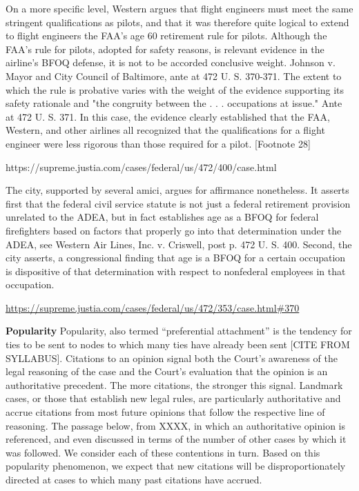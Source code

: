 \documentclass[headsepline=true, abstracton]{scrartcl}
\begin{document}
On a more specific level, Western argues that flight engineers must meet the same stringent qualifications as pilots, and that it was therefore quite logical to extend to flight engineers the FAA's age 60 retirement rule for pilots. Although the FAA's rule for pilots, adopted for safety reasons, is relevant evidence in the airline's BFOQ defense, it is not to be accorded conclusive weight. Johnson v. Mayor and City Council of Baltimore, ante at 472 U. S. 370-371. The extent to which the rule is probative varies with the weight of the evidence supporting its safety rationale and "the congruity between the . . . occupations at issue." Ante at 472 U. S. 371. In this case, the evidence clearly established that the FAA, Western, and other airlines all recognized that the qualifications for a flight engineer were less rigorous than those required for a pilot. [Footnote 28]

https://supreme.justia.com/cases/federal/us/472/400/case.html

The city, supported by several amici, argues for affirmance nonetheless. It asserts first that the federal civil service statute is not just a federal retirement provision unrelated to the ADEA, but in fact establishes age as a BFOQ for federal firefighters based on factors that properly go into that determination under the ADEA, see Western Air Lines, Inc. v. Criswell, post p. 472 U. S. 400. Second, the city asserts, a congressional finding that age is a BFOQ for a certain occupation is dispositive of that determination with respect to nonfederal employees in that occupation. 

\url{https://supreme.justia.com/cases/federal/us/472/353/case.html#370}

\textbf{Popularity} Popularity, also termed ``preferential attachment'' is the tendency for ties to be sent to nodes to which many ties have already been sent [CITE FROM SYLLABUS]. Citations to an opinion signal both the Court's awareness of the legal reasoning of the case and the Court's evaluation that the opinion is an authoritative precedent. The more citations, the stronger this signal. Landmark cases, or those that establish new legal rules, are particularly authoritative and accrue citations from most future opinions that follow the respective line of reasoning. The passage below, from XXXX, in which an authoritative opinion is referenced, and even discussed in terms of the number of other cases by which it was followed. We consider each of these contentions in turn. Based on this popularity phenomenon, we expect that new citations will be disproportionately directed at cases to which many past citations have accrued. 
\end{document}
